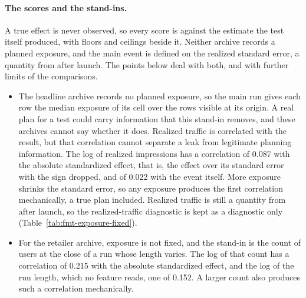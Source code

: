 \paragraph{The scores and the stand-ins.} A true effect is never observed, so every score is against the estimate the test itself produced, with floors and ceilings beside it. Neither archive records a planned exposure, and the main event is defined on the realized standard error, a quantity from after launch. The points below deal with both, and with further limits of the comparisons.
\begin{itemize}
\item The headline archive records no planned exposure, so the main run gives each row the median exposure of its cell over the rows visible at its origin. A real plan for a test could carry information that this stand-in removes, and these archives cannot say whether it does. Realized traffic is correlated with the result, but that correlation cannot separate a leak from legitimate planning information. The log of realized impressions has a correlation of 0.087 with the absolute standardized effect, that is, the effect over its standard error with the sign dropped, and of 0.022 with the event itself. More exposure shrinks the standard error, so any exposure produces the first correlation mechanically, a true plan included. Realized traffic is still a quantity from after launch, so the realized-traffic diagnostic is kept as a diagnostic only (Table~\ref{tab:fmt-exposure-fixed}).
\item For the retailer archive, exposure is not fixed, and the stand-in is the count of users at the close of a run whose length varies. The log of that count has a correlation of 0.215 with the absolute standardized effect, and the log of the run length, which no feature reads, one of 0.152. A larger count also produces such a correlation mechanically.

\end{itemize}
